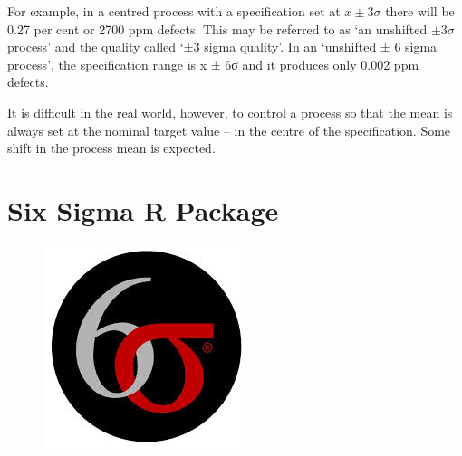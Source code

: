 \documentclass[]{report}
\begin{document}
	For example, in a centred process with a specification set at $x \pm 3\sigma$ there
	will be 0.27 per cent or 2700 ppm defects. This may be referred to as ‘an
	unshifted $\pm 3\sigma$ process’ and the quality called ‘±3 sigma quality’. In an ‘unshifted ± 6 sigma process’, the specification range is x ± 6σ and it produces only 0.002 ppm defects.
	
	It is difficult in the real world, however, to control a process so that the
	mean is always set at the nominal target value – in the centre of the
	specification. Some shift in the process mean is expected.
	
	
	
%	
%	
%	
%	
%	
%	
%	
%	
%	

\newpage
\section{Six Sigma R Package}
\begin{figure}[h!]
\centering
\includegraphics[width=0.4\linewidth]{./sixsigmalogo}
\end{figure}
\end{document}
